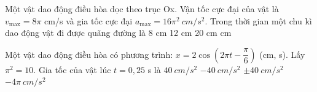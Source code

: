 \begin{ex}%
Một vật dao động điều hòa dọc theo trục Ox. Vận tốc cực đại của vật là $v_{\max} = 8{\pi}$  cm/s và gia tốc cực đại $a_{\max} = 16{\pi ^2}\  cm/s^2$. Trong thời gian một chu kì dao động vật đi được quãng đường là
\choice
{8 cm}
{12 cm}
{20 cm}
{ cm}
\end{ex} 

\begin{ex} %
Một vật dao động điều hòa có phương trình: $x = 2\cos\left(2\pi t - \dfrac{\pi}{6}\right)$ (cm, s). Lấy $\pi^2 = 10$. Gia tốc của vật lúc $t = 0,25$ s là
\choice 
{$40\ cm/s^2$}
{\True $-40\ cm/s^2$}
{$\pm 40\ cm/s^2$}
{$-4\pi\ cm/s^2$}
\end{ex} 


